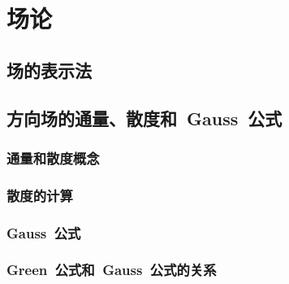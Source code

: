 

\chapter{场\emspace 论}\label{ch:23}

\section{场的表示法}

\section{方向场的通量、散度和~Gauss~公式}
\subsection{通量和散度概念}
\subsection{散度的计算}
\subsection{Gauss~公式}
\subsection{Green~公式和~Gauss~公式的关系}
